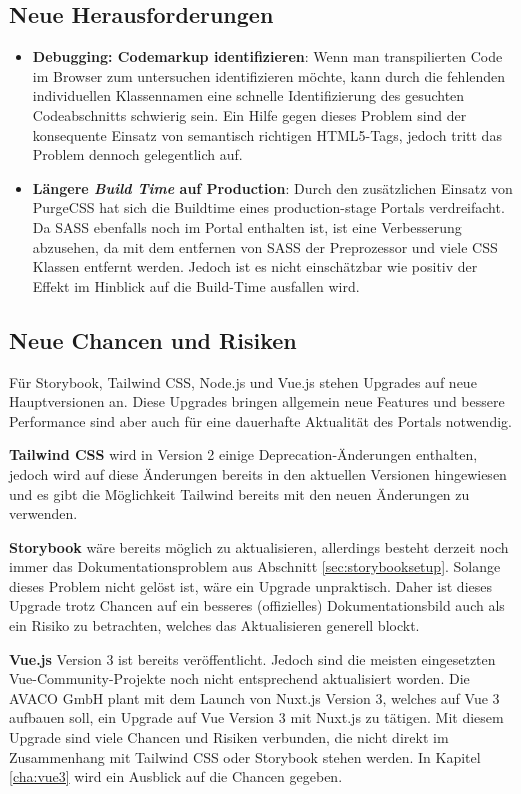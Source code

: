 \subsection{Neue Herausforderungen}
\label{sec:newChallenges}
\begin{itemize}
  \item \textbf{Debugging: Codemarkup identifizieren}: Wenn man transpilierten Code im Browser zum untersuchen identifizieren möchte, kann durch die fehlenden individuellen Klassennamen eine schnelle Identifizierung des gesuchten Codeabschnitts schwierig sein. Ein Hilfe gegen dieses Problem sind der konsequente Einsatz von semantisch richtigen HTML5-Tags, jedoch tritt das Problem dennoch gelegentlich auf.
  \item \textbf{Längere \emph{Build Time} auf Production}: Durch den zusätzlichen Einsatz von PurgeCSS hat sich die Buildtime eines production-stage Portals verdreifacht. Da SASS ebenfalls noch im Portal enthalten ist, ist eine Verbesserung abzusehen, da mit dem entfernen von SASS der Preprozessor und viele CSS Klassen entfernt werden. Jedoch ist es nicht einschätzbar wie positiv der Effekt im Hinblick auf die Build-Time ausfallen wird.
\end{itemize}

\subsection{Neue Chancen und Risiken}
Für Storybook, Tailwind CSS, Node.js und Vue.js stehen Upgrades auf neue Hauptversionen an. Diese Upgrades bringen allgemein neue Features und bessere Performance sind aber auch für eine dauerhafte Aktualität des Portals notwendig. 

\textbf{Tailwind CSS} wird in Version 2 einige Deprecation-Änderungen enthalten, jedoch wird auf diese Änderungen bereits in den aktuellen Versionen hingewiesen und es gibt die Möglichkeit Tailwind bereits mit den neuen Änderungen zu verwenden. 

\textbf{Storybook} wäre bereits möglich zu aktualisieren, allerdings besteht derzeit noch immer das Dokumentationsproblem aus Abschnitt \ref{sec:storybooksetup}. Solange dieses Problem nicht gelöst ist, wäre ein Upgrade unpraktisch. Daher ist dieses Upgrade trotz Chancen auf ein besseres (offizielles) Dokumentationsbild auch als ein Risiko zu betrachten, welches das Aktualisieren generell blockt.

\textbf{Vue.js} Version 3 ist bereits veröffentlicht. Jedoch sind die meisten eingesetzten Vue-Community-Projekte noch nicht entsprechend aktualisiert worden. Die AVACO GmbH plant mit dem Launch von Nuxt.js Version 3, welches auf Vue 3 aufbauen soll, ein Upgrade auf Vue Version 3 mit Nuxt.js zu tätigen.
Mit diesem Upgrade sind viele Chancen und Risiken verbunden, die nicht direkt im Zusammenhang mit Tailwind CSS oder Storybook stehen werden. In Kapitel \ref{cha:vue3} wird ein Ausblick auf die Chancen gegeben.

